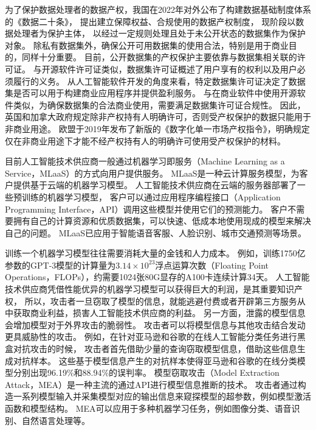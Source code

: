 为了保护数据处理者的数据产权，我国在2022年对外公布了构建数据基础制度体系的《数据二十条》，
提出建立保障权益、合规使用的数据产权制度，
现阶段以数据处理者为保护主体，
以经过一定规则处理且处于未公开状态的数据集作为保护对象。
除私有数据集外，确保公开可用数据集的使用合法，特别是用于商业目的，同样十分重要。
目前，公开数据集的产权保护主要依靠与数据集相关联的许可证。
与开源软件许可证类似，数据集许可证概述了用户享有的权利以及用户必须履行的义务。
从人工智能软件开发的角度来看，特定数据集许可证决定了数据集是否可以用于构建商业应用程序并提供盈利服务。
与在商业软件中使用开源软件类似，为确保数据集的合法商业使用，需要满足数据集许可证合规性。
因此，英国和加拿大政府规定除非产权持有人明确许可，否则受产权保护的数据只能用于非商业用途\cite{Infringement2022}。
欧盟于2019年发布了新版的《数字化单一市场产权指令》，明确规定仅在非商业用途下才能不经产权持有人的明确许可使用受产权保护的材料\cite{triaille2014study}。

目前人工智能技术供应商一般通过机器学习即服务（Machine Learning as a Service，MLaaS）的方式向用户提供服务。
MLaaS是一种云计算服务模型，为客户提供基于云端的机器学习模型。
人工智能技术供应商在云端的服务器部署了一些预训练的机器学习模型，
客户可以通过应用程序编程接口（Application Programming Interface，API）调用这些模型并使用它们的预测能力。
客户不需要拥有自己的计算资源和优质数据集，可以快速、低成本地使用现成的模型来解决自己的问题。 MLaaS已应用于智能语音客服、人脸识别、城市交通预测等场景。

训练一个机器学习模型往往需要消耗大量的金钱和人力成本。
例如，训练1750亿参数的GPT-3模型的计算量为$3.14\times10^{23}$浮点运算次数（Floating Point Operations，FLOPs），约需要1024张80G显存的A100卡连续计算34天\cite{DBLP:conf/nips/BrownMRSKDNSSAA20}。
人工智能技术供应商凭借性能优异的机器学习模型可以获得巨大的利润，是其重要知识产权，
所以，攻击者一旦窃取了模型的信息，就能逃避付费或者开辟第三方服务从中获取商业利益，损害人工智能技术供应商的利益。
另一方面，泄露的模型信息会增加模型对于外界攻击的脆弱性。
攻击者可以将模型信息与其他攻击结合发动更具威胁性的攻击。
例如，在针对亚马逊和谷歌的在线人工智能分类任务进行黑盒对抗攻击的时候，
攻击者首先借助少量的查询窃取模型信息，借助这些信息生成对抗样本。
这些基于模型信息产生的对抗样本使得亚马逊和谷歌的在线分类模型分别出现96.19\%和88.94\%的误判率\cite{DBLP:conf/ccs/PapernotMGJCS17}。
模型窃取攻击（Model Extraction Attack，MEA）是一种主流的通过API进行模型信息推断的技术\cite{DBLP:conf/uss/TramerZJRR16, DBLP:conf/sp/WangG18, DBLP:conf/nips/CravenS95, DBLP:conf/uss/JagielskiCBKP20, DBLP:conf/cvpr/TruongMWP21, DBLP:conf/crypto/CarliniJM20}。
攻击者通过构造一系列模型输入并采集模型对应的输出信息来窥探模型的超参数，例如模型激活函数和模型结构。
MEA可以应用于多种机器学习任务，例如图像分类、语音识别、自然语言处理等。

